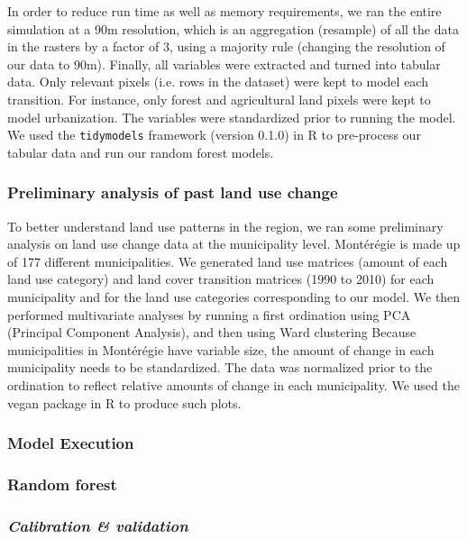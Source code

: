 In order to reduce run time as well as memory requirements, we ran the entire simulation at a 90m resolution, which is an aggregation (resample) of all the data in the rasters by a factor of 3, using a majority rule (changing the resolution of our data to 90m). Finally, all variables were extracted and turned into tabular data. Only relevant pixels (i.e. rows in the dataset) were kept to model each transition. For instance, only forest and agricultural land pixels were kept to model urbanization. The variables were standardized prior to running the model. We used the \verb|tidymodels| framework (version 0.1.0) in R to pre-process our tabular data and run our random forest models. \\

\subsubsection{Preliminary analysis of past land use change}

To better understand land use patterns in the region, we ran some preliminary analysis on land use change data at the municipality level. Montérégie is made up of 177 different municipalities. We generated land use matrices (amount of each land use category) and land cover transition matrices (1990 to 2010) for each municipality and for the land use categories corresponding to our model. We then performed multivariate analyses by running a first ordination using PCA (Principal Component Analysis), and then using Ward clustering %
Because municipalities in Montérégie have variable size, the amount of change in each municipality needs to be standardized. The data was normalized prior to the ordination to reflect relative amounts of change in each municipality. We used the vegan package in R to produce such plots.\\

\subsubsection{Model Execution}

\subsubsection*{Random forest}

\subsubsection*{\textit{Calibration \& validation}}

